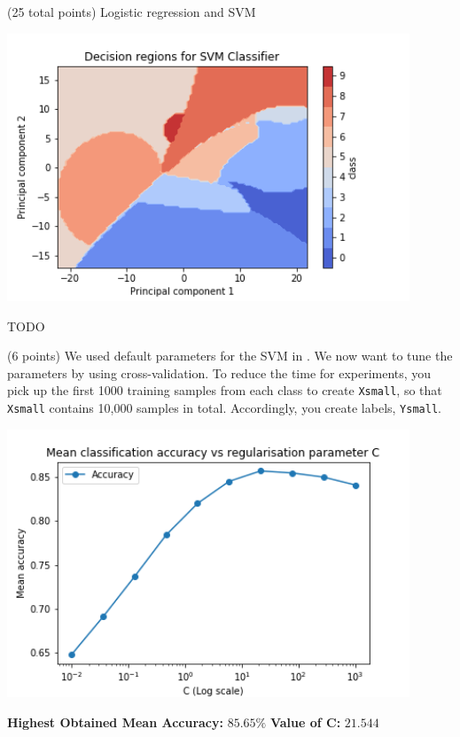 \documentclass[12pt]{article}
\begin{document}
\begin{question}{(25 total points) Logistic regression and SVM}
\begin{subquestion}
      \begin{answerbox}{35em}
         \begin{center}
               \includegraphics[width=0.9\textwidth]{results/2_4.png}
         \end{center}
         TODO
      \end{answerbox}
  


   \end{subquestion}

   \begin{subquestion}{(6 points)
       We used default parameters for the SVM in .
       We now want to tune the parameters by using cross-validation.
       To reduce the time for experiments, you pick up the first 1000
       training samples from each class to create \texttt{Xsmall}, so that \texttt{Xsmall}
       contains 10,000 samples in total. Accordingly, you create
       labels, \texttt{Ysmall}.
     } \label{Q2.5}


   

      \begin{answerbox}{30em}
        \begin{center}
            \includegraphics[width=0.9\textwidth]{results/2_5.png}    
        \end{center}
        \textbf{Highest Obtained Mean Accuracy: } $85.65\%$
        \newline
        \textbf{Value of C: } $21.544$
      \end{answerbox}
  



\end{subquestion}
\end{question}
\end{document}
